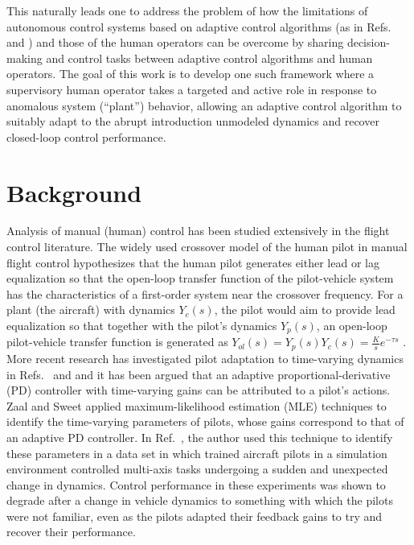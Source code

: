 This naturally leads one to address the problem of how the limitations of autonomous control systems based on adaptive control algorithms (as in Refs.~\cite{narendra2012stable} and \cite{lavretsky2013robust}) and those of the human operators can be overcome by sharing decision-making and control tasks between adaptive control algorithms and human operators. The goal of this work is to develop one such framework where a supervisory human operator takes a targeted and active role in response to anomalous system (``plant'') behavior, allowing an adaptive control algorithm to suitably adapt to the abrupt introduction unmodeled dynamics and recover closed-loop control performance.  

\section{Background}
Analysis of manual (human) control \cite{hess2015modeling, zaal2016manual, mcruer1967review, mcruer1980human} has been studied extensively in the flight control literature. The widely used crossover model of the human pilot in manual flight control \cite{mcruer1967review} hypothesizes that the human pilot generates either lead or lag equalization so that the open-loop transfer function of the pilot-vehicle system has the characteristics of a first-order system near the crossover frequency. For a plant (the aircraft) with dynamics $Y_c(s)$, the pilot would aim to provide lead equalization so that together with the pilot's dynamics $Y_p(s)$, an open-loop pilot-vehicle transfer function is generated as $Y_{ol}(s)  = Y_p(s)Y_c(s) = \frac{K}{s} e^{-\tau s}$ \cite{mcruer1980human}. More recent research has investigated pilot adaptation to time-varying dynamics in Refs.~\cite{hess2015modeling} and \cite{hess2009modeling} and it has been argued that an adaptive proportional-derivative (PD) controller with time-varying gains can be attributed to a pilot's actions. Zaal and Sweet \cite{zaal2011estimation} applied maximum-likelihood estimation (MLE) techniques to identify the time-varying parameters of pilots, whose gains correspond to that of an adaptive PD controller. In  Ref.~\cite{zaal2016manual}, the author used this technique to identify these parameters in a data set in which trained aircraft pilots in a simulation environment controlled multi-axis tasks undergoing a sudden and unexpected change in dynamics. Control performance in these experiments was shown to degrade after a change in vehicle dynamics to something with which the pilots were not familiar, even as the pilots adapted their feedback gains to try and recover their performance.

